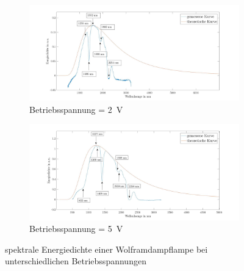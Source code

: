 \documentclass[a4paper,twoside,final]{article}
\begin{document}
\begin{figure}[htp]
  \centering
  \begin{subfigure}{0.9\textwidth}
    \includegraphics[width=\textwidth]{Bilder/Wolframlampe2V.jpg}
    \caption{Betriebsspannung = \SI{2}{\volt}}
  \end{subfigure}
  \begin{subfigure}{0.9\textwidth}
    \includegraphics[width=\textwidth]{Bilder/Wolframlampe5V.jpg}
    \caption{Betriebsspannung = \SI{5}{\volt}}
  \end{subfigure}\hspace{0.5cm}
  \caption{spektrale Energiedichte einer Wolframdampflampe bei unterschiedlichen Betriebsspannungen}
  \label{fig:Wolframlampe}
\end{figure}
\end{document}
